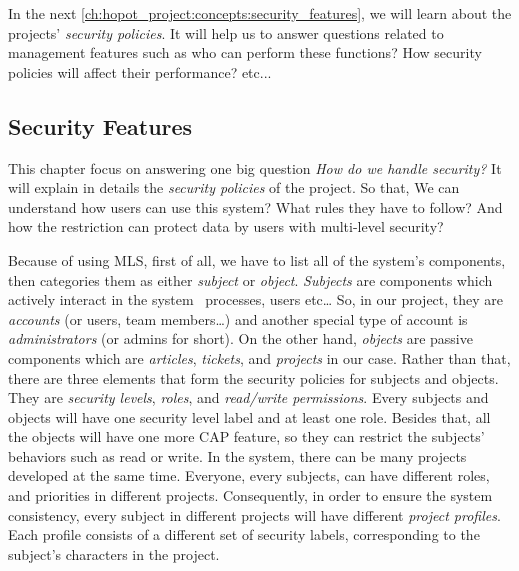 In the next \autoref{ch:hopot_project:concepts:security_features}, we will learn about the projects' \emph{security policies}.
It will help us to answer questions related to management features such as who can perform these functions? How security policies will affect their performance? etc...


\subsection{Security Features}
\label{ch:hopot_project:concepts:security_features}

This chapter focus on answering one big question \emph{How do we handle security?}
It will explain in details the \emph{security policies} of the project.
So that, We can understand how users can use this system? What rules they have to follow? And how the restriction can protect data by users with multi-level security?

Because of using MLS, first of all, we have to list all of the system's components, then categories them as either \emph{subject} or \emph{object}.
\emph{Subjects} are components which actively interact in the system \eg\ processes, users etc\dots
So, in our project, they are \emph{accounts} (or users, team members\dots) and another special type of account is \emph{administrators} (or admins for short).
On the other hand, \emph{objects} are passive components which are \emph{articles}, \emph{tickets}, and \emph{projects} in our case.
Rather than that, there are three elements that form the security policies for subjects and objects. They are \emph{security levels}, \emph{roles}, and \emph{read/write permissions}.
Every subjects and objects will have one security level label and at least one role. Besides that, all the objects will have one more CAP feature, so they can restrict the subjects' behaviors such as read or write.
In the system, there can be many projects developed at the same time.
Everyone, every subjects, can have different roles, and priorities in different projects.
Consequently, in order to ensure the system consistency, every subject in different projects will have different \emph{project profiles}.
Each profile consists of a different set of security labels, corresponding to the subject's characters in the project. %

